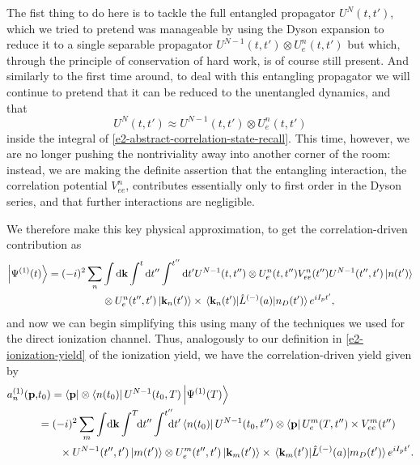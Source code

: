 The fist thing to do here is to tackle the full entangled propagator $U^N(t,t')$, which we tried to pretend was manageable by using the Dyson expansion to reduce it to a single separable propagator $U^{N-1}(t,t') \otimes U_e^n(t,t')$ but which, through the principle of conservation of hard work, is of course still present. And similarly to the first time around, to deal with this entangling propagator we will continue to pretend that it can be reduced to the unentangled dynamics, and that
\begin{equation}
U^N(t,t') \approx U^{N-1}(t,t') \otimes U_e^n(t,t')
\end{equation}
inside the integral of \eqref{e2-abstract-correlation-state-recall}. This time, however, we are no longer pushing the nontriviality away into another corner of the room: instead, we are making the definite assertion that the entangling interaction, the correlation potential $V_{ee}^n$, contributes essentially only to first order in the Dyson series, and that further interactions are negligible.

We therefore make this key physical approximation, to get the correlation-driven contribution as
\begin{align}
\ket{\Psi^{(1)}(t)}
=(-i)^2\sum_n  & \int\d\vb{k}\int^t\d t''\int^{t''}\d t'U^{N-1}(t,t'') \otimes U_e^n(t,t'')V_{ee}^n(t'') U^{N-1}(t'',t')\ket{n(t')}
\nonumber \\ & \otimes 
U_e^n(t'',t')\ket{\vb{k}_n(t')}\times\matrixel{\vb{k}_n(t')}{\hat{L}^{(-)}(a)}{n_D(t')}e^{iI_p t'},
\label{e2-abstract-correlation-state-approximate}
\end{align}
and now we can begin simplifying this using many of the techniques we used for the direct ionization channel. Thus, analogously to our definition in \eqref{e2-ionization-yield} of the ionization yield, we have the correlation-driven yield given by
\begin{align}
a_n^{(1)}(\vb{p},& \tn)
=
\bra{\vb{p}}\otimes\bra{n(\tn)}U^{N-1}(\tn,T)\ket{\Psi^{(1)}(T)}
\nonumber \\ & =
(-i)^2\sum_m  \int\!\d\vb{k}\int^T\!\!\d t''\int^{t''}\!\!\!\!\d t'
\bra{n(\tn)}U^{N-1}(\tn,t'') \otimes \bra{\vb{p}}U_e^m(T,t'')
\times V_{ee}^m(t'') 
\nonumber \\ & \quad \quad \times
U^{N-1}(t'',t')\ket{m(t')}
\otimes 
U_e^m(t'',t')\ket{\vb{k}_m(t')}
\times\matrixel{\vb{k}_m(t')}{\hat{L}^{(-)}(a)}{m_D(t')}e^{iI_p t'}.
\label{e2-correlation-driven-yield-initial}
\end{align}

